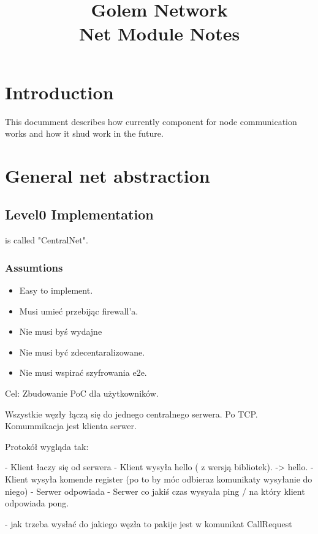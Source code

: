 \documentclass[12pt]{article}
\title{Golem Network \\ Net Module Notes}
\begin{document}
\maketitle{}
\section{Introduction}

This documment describes how currently component for node communication works 
and how it shud work in the future.

\section{General net abstraction}


\subsection{Level0 Implementation}

is called "CentralNet".

\subsubsection{Assumtions}

\begin{itemize}
    \item Easy to implement.
    \item Musi umieć przebijąc firewall'a. 
    \item Nie musi byś wydajne
    \item Nie musi być zdecentaralizowane.
    \item Nie musi wspirać szyfrowania e2e. 
\end{itemize}

Cel: Zbudowanie PoC dla użytkowników.

Wszystkie węzły łączą się do jednego centralnego serwera. Po TCP. Komummikacja jest klienta serwer.


Protokół wygląda tak:

 - Klient łaczy się od serwera
 - Klient wysyła hello ( z wersją bibliotek). -> hello.
 - Klient wysyła komende register (po to by móc odbieraz komunikaty wysyłanie do niego)
 - Serwer odpowiada 
 - Serwer co jakiś czas wysyała ping / na który klient odpowiada pong.


 - jak trzeba wysłać do jakiego węzła to pakije jest w komunikat CallRequest
\end{document}
